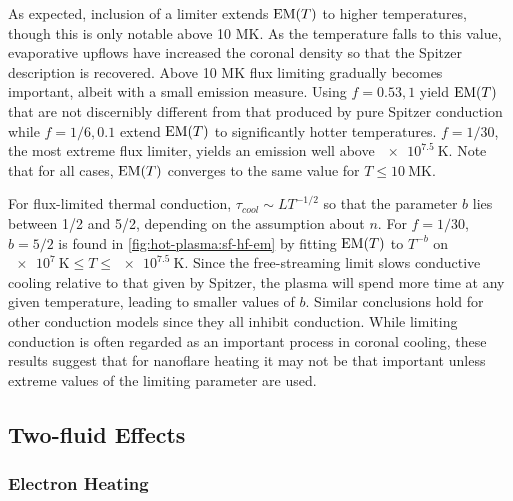 As expected, inclusion of a limiter extends $\emd[T]$ to higher temperatures, though this is only notable above 10 MK. As the temperature falls to this value, evaporative upflows have increased the coronal density so that the Spitzer description is recovered. Above 10 MK flux limiting gradually becomes important, albeit with a small emission measure. Using $f=0.53,1$ yield $\emd[T]$ that are not discernibly different from that produced by pure Spitzer conduction while $f=1/6,0.1$ extend $\emd[T]$ to significantly hotter temperatures. $f=1/30$, the most extreme flux limiter, yields an emission well above $\SI{e7.5}{\kelvin}$. Note that for all cases, $\emd[T]$ converges to the same value for $T\le\SI{10}{\mega\kelvin}$.

For flux-limited thermal conduction, $\tau_{cool} \sim LT^{-1/2}$ so that the parameter $b$ lies between 1/2 and 5/2, depending on the assumption about $n$. For $f = 1/30$, $b = 5/2$ is found in \autoref{fig:hot-plasma:sf-hf-em} by fitting $\emd[T]$ to $T^{-b}$ on $\SI{e7}{\kelvin} \le T \le \SI{e7.5}{\kelvin}$. Since the free-streaming limit slows conductive cooling relative to that given by Spitzer, the plasma will spend more time at any given temperature, leading to smaller values of $b$. Similar conclusions hold for other conduction models \citep[e.g. the non-local model discussed in the coronal context by][]{karpen_nonlocal_1987,west_lifetime_2008} since they all inhibit conduction. While limiting conduction is often regarded as an important process in coronal cooling, these results suggest that for nanoflare heating it may not be that important unless extreme values of the limiting parameter are used.

\subsection{Two-fluid Effects}\label{hot-plasma:subsec:two-fluid-res}

\subsubsection{Electron Heating}\label{hot-plasma:subsubsec:electron-heating}

